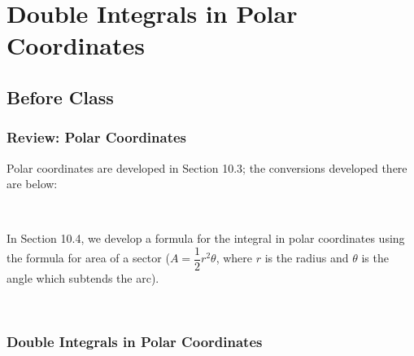 \documentclass[notes]{subfiles}
\begin{document}
	\fancyhead[LO,RE]{\bfseries \small \currentname}
	\fancyfoot[C]{{}}
	\fancyfoot[RO,LE]{\large \thepage}	%


\section*{Double Integrals in Polar Coordinates}\label{cs153}
	\subsection*{Before Class}
	
	\subsubsection*{Review: Polar Coordinates}
		Polar coordinates are developed in Section 10.3; the conversions developed there are below:
		
		\begin{rmk}
			\\[50pt]
		\end{rmk}
		
		In Section 10.4, we develop a formula for the integral in polar coordinates using the formula for area of a sector ($A = \dfrac{1}{2}r^2\theta$, where $r$ is the radius and $\theta$ is the angle which subtends the arc).
		
		\begin{rmk}
			\\[25pt]
		\end{rmk}
		
	\subsubsection*{Double Integrals in Polar Coordinates}
		
		
\end{document}
